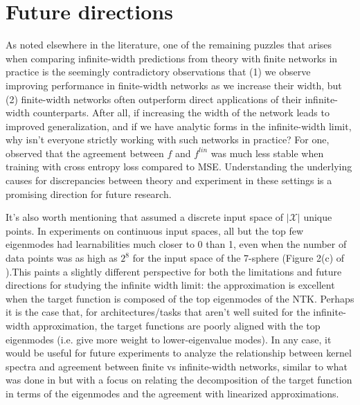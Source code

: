 \documentclass{article}
\newcommand\mc{\mathcal}
\begin{document}
\section{Future directions} %

\begin{comment}
Based on the limitations in the previous section, what are fruitful directions for future research?
These might include exploiting more of the structure of the problem to tighten the results.  Or it might be taking these ideas and applying them to a different setting.
This is your opportunity to practice formulating a research question, which might be good for the final project.
\end{comment}

As noted elsewhere in the literature, one of the remaining puzzles that arises when comparing infinite-width predictions from theory with finite networks in practice is the seemingly contradictory observations that (1) we observe improving performance in finite-width networks as we increase their width, but (2) finite-width networks often outperform direct applications of their infinite-width counterparts. After all, if increasing the width of the network leads to improved generalization, and if we have analytic forms in the infinite-width limit, why isn't everyone strictly working with such networks in practice? For one, \cite{lee2019} observed that the agreement between $f$ and $f^{lin}$ was much less stable when training with cross entropy loss compared to MSE. Understanding the underlying causes for discrepancies between theory and experiment in these settings is a promising direction for future research.

It's also worth mentioning that \cite{simon2021} assumed a discrete input space of $|\mc X|$ unique points. In experiments on continuous input spaces, all but the top few eigenmodes had learnabilities much closer to 0 than 1, even when the number of data points was as high as $2^8$ for the input space of the 7-sphere (Figure 2(c) of \cite{simon2021}).This paints a slightly different perspective for both the limitations and future directions for studying the infinite width limit: the approximation is excellent when the target function is composed of the top eigenmodes of the NTK. Perhaps it is the case that, for architectures/tasks that aren't well suited for the infinite-width approximation, the target functions are poorly aligned with the top eigenmodes (i.e. give more weight to lower-eigenvalue modes). In any case, it would be useful for future experiments to analyze the relationship between kernel spectra and agreement between finite vs infinite-width networks, similar to what was done in \cite{Bahri} but with a focus on relating the decomposition of the target function in terms of the eigenmodes and the agreement with linearized approximations.
\end{document}
